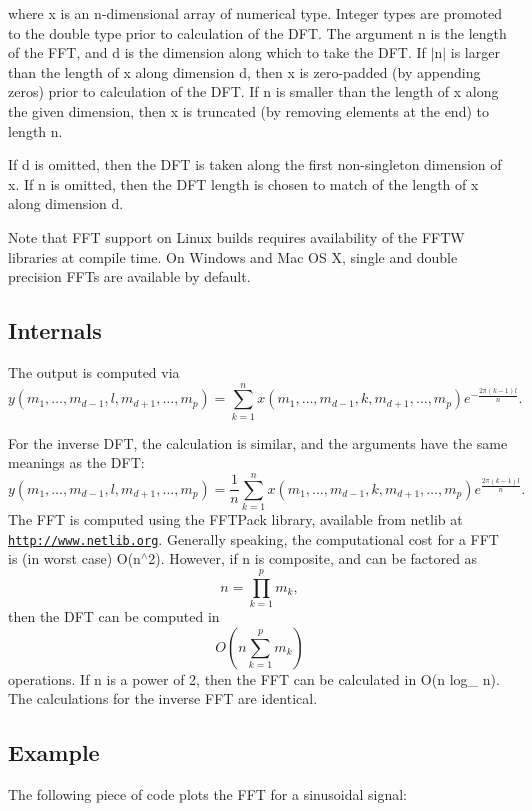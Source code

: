  where {\ttfamily x} is an {\ttfamily n}-\/dimensional array of numerical type. Integer types are promoted to the {\ttfamily double} type prior to calculation of the D\-F\-T. The argument {\ttfamily n} is the length of the F\-F\-T, and {\ttfamily d} is the dimension along which to take the D\-F\-T. If $|$n$|$ is larger than the length of {\ttfamily x} along dimension {\ttfamily d}, then {\ttfamily x} is zero-\/padded (by appending zeros) prior to calculation of the D\-F\-T. If {\ttfamily n} is smaller than the length of {\ttfamily x} along the given dimension, then {\ttfamily x} is truncated (by removing elements at the end) to length {\ttfamily n}.

If {\ttfamily d} is omitted, then the D\-F\-T is taken along the first non-\/singleton dimension of {\ttfamily x}. If {\ttfamily n} is omitted, then the D\-F\-T length is chosen to match of the length of {\ttfamily x} along dimension {\ttfamily d}.

Note that F\-F\-T support on Linux builds requires availability of the F\-F\-T\-W libraries at compile time. On Windows and Mac O\-S X, single and double precision F\-F\-Ts are available by default. \hypertarget{transforms_svd_Function}{}\subsection{Internals}\label{transforms_svd_Function}
The output is computed via \[ y(m_1,\ldots,m_{d-1},l,m_{d+1},\ldots,m_{p}) = \sum_{k=1}^{n} x(m_1,\ldots,m_{d-1},k,m_{d+1},\ldots,m_{p}) e^{-\frac{2\pi(k-1)l}{n}}. \]

For the inverse D\-F\-T, the calculation is similar, and the arguments have the same meanings as the D\-F\-T\-: \[ y(m_1,\ldots,m_{d-1},l,m_{d+1},\ldots,m_{p}) = \frac{1}{n} \sum_{k=1}^{n} x(m_1,\ldots,m_{d-1},k,m_{d+1},\ldots,m_{p}) e^{\frac{2\pi(k-1)l}{n}}. \] The F\-F\-T is computed using the F\-F\-T\-Pack library, available from netlib at {\ttfamily \href{http://www.netlib.org}{\tt http\-://www.\-netlib.\-org}}. Generally speaking, the computational cost for a F\-F\-T is (in worst case) {\ttfamily O(n$^\wedge$2)}. However, if {\ttfamily n} is composite, and can be factored as \[ n = \prod_{k=1}^{p} m_k, \] then the D\-F\-T can be computed in \[ O(n \sum_{k=1}^{p} m_k) \] operations. If {\ttfamily n} is a power of 2, then the F\-F\-T can be calculated in {\ttfamily O(n log\-\_ n)}. The calculations for the inverse F\-F\-T are identical. \hypertarget{variables_struct_Example}{}\subsection{Example}\label{variables_struct_Example}
The following piece of code plots the F\-F\-T for a sinusoidal signal\-:


